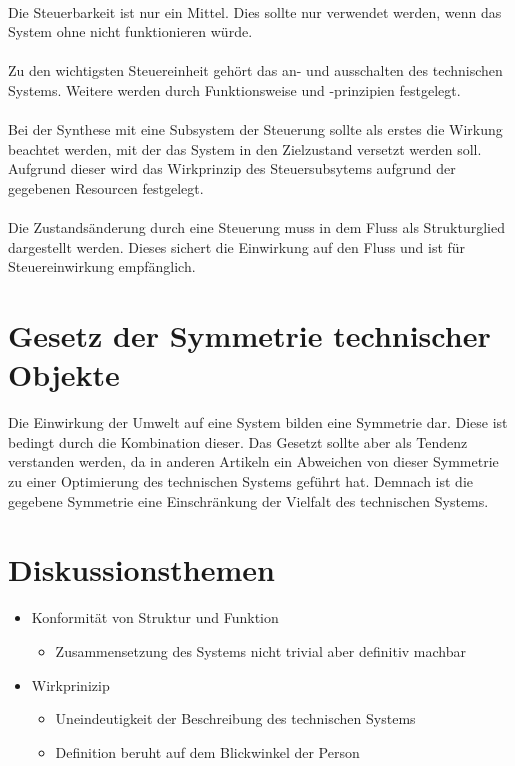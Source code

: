 \documentclass[DIV=22, 10pt, a4paper]{scrartcl}
\begin{document}
    \paragraph{}
    Die Steuerbarkeit ist nur ein Mittel. 
    Dies sollte nur verwendet werden, wenn das System ohne nicht funktionieren würde.

    \paragraph{}
    Zu den wichtigsten Steuereinheit gehört das an- und ausschalten des technischen Systems.
    Weitere werden durch Funktionsweise und -prinzipien festgelegt.

    \paragraph{}
    Bei der Synthese mit eine Subsystem der Steuerung sollte als erstes die Wirkung beachtet werden, mit der das System in den Zielzustand versetzt werden soll.
    Aufgrund dieser wird das Wirkprinzip des Steuersubsytems aufgrund der gegebenen Resourcen festgelegt.

    \paragraph{}
    Die Zustandsänderung durch eine Steuerung muss in dem Fluss als Strukturglied dargestellt werden.
    Dieses sichert die Einwirkung auf den Fluss und ist für Steuereinwirkung empfänglich.

    \section{Gesetz der Symmetrie technischer Objekte}
    Die Einwirkung der Umwelt auf eine System bilden eine Symmetrie dar.
    Diese ist bedingt durch die Kombination dieser.
    Das Gesetzt sollte aber als Tendenz verstanden werden, da in anderen Artikeln ein Abweichen von dieser Symmetrie zu einer Optimierung des technischen Systems geführt hat.
    Demnach ist die gegebene Symmetrie eine Einschränkung der Vielfalt des technischen Systems.

    \section{Diskussionsthemen}
    \begin{itemize}
        \item Konformität von Struktur und Funktion
        \begin{itemize}
            \item Zusammensetzung des Systems nicht trivial aber definitiv machbar
        \end{itemize}
        \item Wirkprinizip
        \begin{itemize}
            \item Uneindeutigkeit der Beschreibung des technischen Systems
            \item Definition beruht auf dem Blickwinkel der Person
        \end{itemize}
    \end{itemize}
\end{document}
